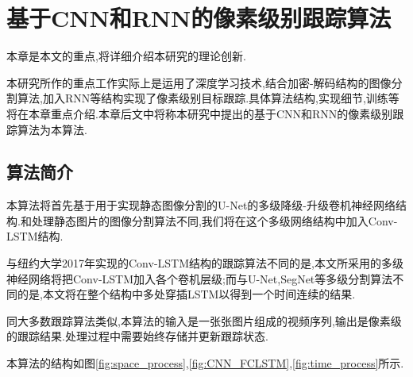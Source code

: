 
\chapter{基于CNN和RNN的像素级别跟踪算法}
本章是本文的重点,将详细介绍本研究的理论创新.
\par
本研究所作的重点工作实际上是运用了深度学习技术,结合加密-解码结构的图像分割算法,加入RNN等结构实现了像素级别目标跟踪.具体算法结构,实现细节,训练等将在本章重点介绍.本章后文中将称本研究中提出的基于CNN和RNN的像素级别跟踪算法为本算法.

\section{算法简介}
本算法将首先基于用于实现静态图像分割的U-Net\supercite{ronneberger2015u}的多级降级-升级卷机神经网络结构.和处理静态图片的图像分割算法不同,我们将在这个多级网络结构中加入Conv-LSTM结构.
\par
与纽约大学2017年实现的Conv-LSTM结构的跟踪算法不同的是,本文所采用的多级神经网络将把Conv-LSTM加入各个卷机层级;而与U-Net,SegNet等多级分割算法不同的是,本文将在整个结构中多处穿插LSTM以得到一个时间连续的结果.
\par
同大多数跟踪算法类似,本算法的输入是一张张图片组成的视频序列,输出是像素级的跟踪结果.处理过程中需要始终存储并更新跟踪状态.
\par
本算法的结构如图\ref{fig:space_process},\ref{fig:CNN_FCLSTM},\ref{fig:time_process}所示.

